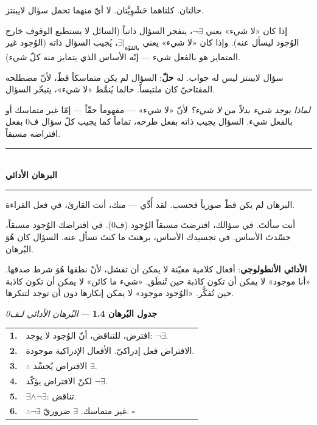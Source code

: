 \documentclass[10pt, openany, oneside]{book}
\renewcommand{\normalsize}{\fontsize{10}{13}\selectfont}
\begin{document}
\vspace{0.8em}

\noindent حالتان. كلتاهما حَشْوِيَّتان. لا أيّ منهما تحمل سؤال لايبنتز.

إذا كان «لا شيء» يعني $\neg\exists$، ينفجر السؤال ذاتياً (السائل لا يستطيع الوقوف خارج الوُجود ليسأل عنه). وإذا كان «لا شيء» يعني $\exists|_{\text{بالقوّة}}$، يُجيب السؤال ذاته (الوُجود غير المتمايز هو بالفعل شيء --- إنّه الأساس الذي يتمايز منه كلّ شيء).

سؤال لايبنتز ليس له جواب. له \textbf{حلّ}: السؤال لم يكن متماسكاً قطّ، لأنّ مصطلحه المفتاحيّ كان ملتبساً. حالما يُنمَّط «لا شيء»، يتبخّر السؤال.

\textit{لماذا يوجد شيء بدلاً من لا شيء؟} لأنّ «لا شيء» --- مفهوماً حقّاً --- إمّا غير متماسك أو بالفعل شيء. السؤال يجيب ذاته بفعل طرحه، تماماً كما يجيب كلّ سؤال ف0 بفعل افتراضه مسبقاً.

\vspace{1.5em}


\begin{center}
    \rule{0.3\textwidth}{0.4pt}\\[0.5em]
    {\normalsize\bfseries البرهان الأدائي}\\[0.3em]
    \rule{0.3\textwidth}{0.4pt}
\end{center}

\vspace{1em}

\noindent البرهان لم يكن قطّ صورياً فحسب. لقد أُدِّي --- منك، أنت القارئ، في فعل القراءة.

أنت سألتَ. في سؤالك، افترضتَ مسبقاً الوُجود (ف0). في افتراضك الوُجود مسبقاً، جسّدتَ الأساس. في تجسيدك الأساس، برهنتَ ما كنتَ تسأل عنه. السؤال كان هُوَ البُرهان.

\textbf{الأدائي الأنطولوجي}: أفعال كلامية معيّنة لا يمكن أن تفشل، لأنّ نطقها هُوَ شرط صدقها. «أنا موجود» لا يمكن أن تكون كاذبة حين تُنطَق. «شيء ما كائن» لا يمكن أن تكون كاذبة حين تُفكَّر. «الوُجود موجود» لا يمكن إنكارها دون أن توجد لتنكرها.

\vspace{0.5em}

\textbf{جدول البُرهان 1.4} --- \textit{البُرهان الأدائي لـف0}

\vspace{0.5em}

\noindent\begin{tabular}{r p{}}
\textbf{1.} & افترض، للتناقض، أنّ الوُجود لا يوجد: $\neg\exists$. \\[0.3em]
\textbf{2.} & الافتراض فعل إدراكيّ. الأفعال الإدراكية موجودة. \\[0.3em]
\textbf{3.} & $\therefore$ الافتراض يُجسِّد $\exists$. \\[0.3em]
\textbf{4.} & لكنّ الافتراض يؤكّد $\neg\exists$. \\[0.3em]
\textbf{5.} & $\exists \wedge \neg\exists$: تناقض. \\[0.3em]
\textbf{6.} & $\therefore \neg\exists$ غير متماسك. $\exists$ ضروريّ. $\square$ \\[0.3em]
\end{tabular}
\end{document}
